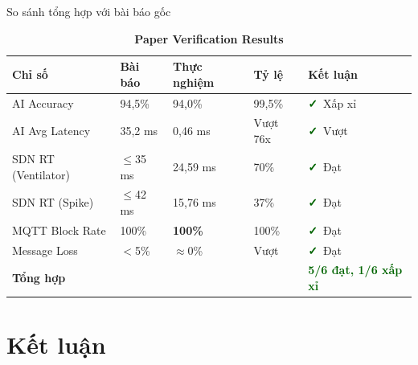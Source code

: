 \documentclass[aspectratio=169, 12pt]{beamer}
\newcommand{\cmark}{\textcolor{darkgreen}{\textbf{✓}}}
\begin{document}
\begin{frame}{So sánh tổng hợp với bài báo gốc}

\begin{table}
\caption*{\textbf{Paper Verification Results}}
\renewcommand{\arraystretch}{1.4}
\begin{tabular}{lllll}
\toprule
\textbf{Chỉ số} & \textbf{Bài báo} & \textbf{Thực nghiệm} & \textbf{Tỷ lệ} & \textbf{Kết luận} \\
\midrule
AI Accuracy         & 94,5\%    & 94,0\%      & 99,5\%   & \cmark\ Xấp xỉ \\
AI Avg Latency      & 35,2 ms   & 0,46 ms     & Vượt 76x & \cmark\ Vượt \\
SDN RT (Ventilator) & $\leq$35 ms & 24,59 ms  & 70\%     & \cmark\ Đạt \\
SDN RT (Spike)      & $\leq$42 ms & 15,76 ms  & 37\%     & \cmark\ Đạt \\
MQTT Block Rate     & 100\%     & \textbf{100\%} & 100\% & \cmark\ Đạt \\
Message Loss        & $<$5\%    & $\approx$0\% & Vượt   & \cmark\ Đạt \\
\midrule
\multicolumn{4}{l}{\textbf{Tổng hợp}} & \textcolor{darkgreen}{\textbf{5/6 đạt, 1/6 xấp xỉ}} \\
\bottomrule
\end{tabular}
\end{table}

\end{frame}

\section{Kết luận}
\end{document}

